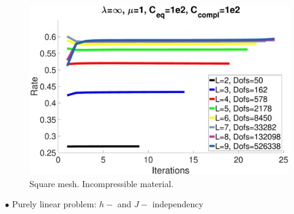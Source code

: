 \documentclass[8pt, oneside]{beamer}   	%
\begin{document}
\begin{frame}
\begin{figure}[htbp!]
	\quad
		\includegraphics[scale=0.08]{img/SquareRateIncompressible.eps}
	\caption{Square mesh. Incompressible material.}
	\label{ResidualRateSquare}	
	\end{figure}
	$\bullet$ Purely linear problem: $h-$ and $J-$ independency
\end{frame}
\end{document}
